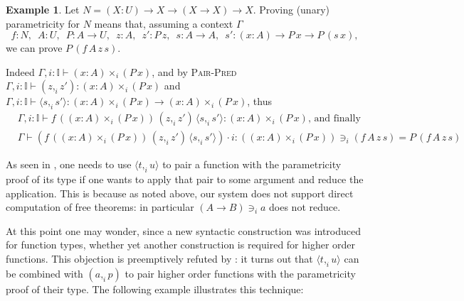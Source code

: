 \documentclass[english]{PaperTools/latex/entcs}
\theoremstyle{plain}
\theoremstyle{definition}
\newtheorem{example}[theorem]{Example}
\theoremstyle{remark}
\newcommand\CP[3]{(#2,_{#1} #3)}
\newcommand\CTimes[2]{(#2) ×_{#1}}
\newcommand\param[1]{\!\cdot\!#1}
\newcommand\op[1]{∋_{#1}}
\newcommand\fp[3]{⟨#2 ,_{#1} #3⟩}
\begin{document}
\begin{example}
  \label{ex:church-nat}
Let $N = (X : U) → X → (X → X) → X$.
Proving (unary) parametricity for $N$ means that, assuming a context $Γ$
  $$f : N,\enspace
    A : U,\enspace
    P : A → U,\enspace
    z : A,\enspace
    z' : P\, z,\enspace
    s : A → A,\enspace
    s' : (x:A) → P\, x → P\, (s\, x),$$
we can prove $P\, (f\, A\, z\, s)$.

Indeed
  $Γ, i:𝕀⊢\CTimes i {x:A} {(P\,x)}$,
  and by \textsc{Pair-Pred}
  $Γ, i:𝕀⊢ \CP i z {z'} : \CTimes i {x:A} {(P\,x)}$ and
  $Γ, i:𝕀⊢ \fp i s {s'} : \CTimes i {x:A} {(P\,x)} → \CTimes i {x:A} {(P\,x)}$,
thus
  \begin{align*}
    &Γ, i:𝕀 ⊢ f\, (\CTimes i {x:A} {(P\,x)})\, {\CP i z {z'}}\, \fp i s {s'} : \CTimes i {x:A} {(P\,x)}\text{, and finally}\\
    &Γ ⊢ (f\, (\CTimes i {x:A} {(P\,x)})\, {\CP i z {z'}}\, \fp i s {s'}) \param i
       : (\CTimes i {x:A} {(P\,x)}) \op i (f\, A\, z\, s)
       = P\, (f\, A\, z\, s)
  \end{align*}
\end{example}

As seen in , one needs to use
$\fp i t u$ to pair a function with the parametricity proof of its type
if one wants to apply that pair to some argument and reduce the
application.  This is because as noted above, our system does not
support direct computation of free theorems: in particular $(A → B) \op i a$
does not reduce.

At this point one may wonder, since a new syntactic construction was
introduced for function types, whether yet another construction is required
for higher order functions.  This objection is preemptively refuted by
: it turns out that $\fp i t u$ can be combined
with $\CP i a p$ to pair higher order functions with the parametricity
proof of their type.  The following example illustrates this technique:
\end{document}
